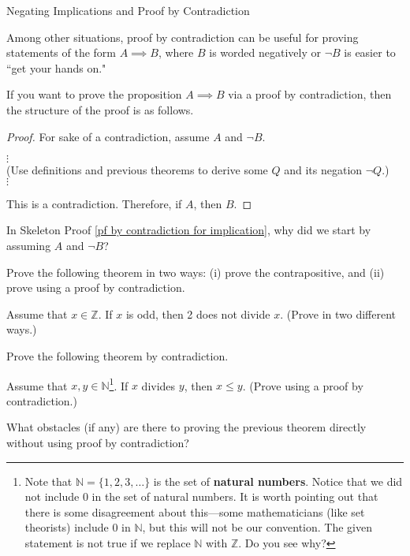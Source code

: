 \begin{section}{Negating Implications and Proof by Contradiction}
\begin{skeleton}
\end{skeleton}

Among other situations, proof by contradiction can be useful for proving statements of the form $A\implies B$, where $B$ is worded negatively or $\neg B$ is easier to ``get your hands on."  

\begin{skeleton}\label{pf by contradiction for implication}
If you want to prove the proposition $A\implies B$ via a proof by contradiction, then the structure of the proof is as follows.

\bigskip

\begin{textbox}
\begin{proof}
For sake of a contradiction, assume $A$ and $\neg B$.
\begin{center}
$\vdots$\\
(Use definitions and previous theorems to derive some $Q$ and its negation $\neg Q$.)\\
$\vdots$
\end{center}
\noindent This is a contradiction.  Therefore, if $A$, then $B$.
\end{proof}
\end{textbox}
\end{skeleton}

\begin{question}
In Skeleton Proof \ref{pf by contradiction for implication}, why did we start by assuming $A$ and $\neg B$?
\end{question}

Prove the following theorem in two ways: (i) prove the contrapositive, and (ii) prove using a proof by contradiction.

\begin{theorem}[*]
Assume that $x\in\mathbb{Z}$.  If $x$ is odd, then 2 does not divide $x$. (Prove in two different ways.)
\end{theorem}

Prove the following theorem by contradiction.

\begin{theorem}[*]
Assume that $x,y\in\mathbb{N}$\footnote{Note that $\mathbb{N}=\{1,2,3,\ldots\}$ is the set of \textbf{natural numbers}. Notice that we did not include $0$ in the set of natural numbers.  It is worth pointing out that there is some disagreement about this---some mathematicians (like set theorists) include $0$ in $\mathbb{N}$, but this will not be our convention.  The given statement is not true if we replace $\mathbb{N}$ with $\mathbb{Z}$.  Do you see why?}.  If $x$ divides $y$, then $x\leq y$. (Prove using a proof by contradiction.)
\end{theorem}

\begin{question}
What obstacles (if any) are there to proving the previous theorem directly without using proof by contradiction?
\end{question}

\end{section}
